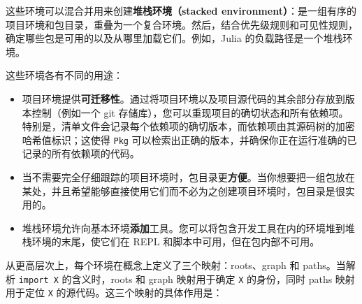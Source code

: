 这些环境可以混合并用来创建\textbf{堆栈环境（stacked environment）}：是一组有序的项目环境和包目录，重叠为一个复合环境。然后，结合优先级规则和可见性规则，确定哪些包是可用的以及从哪里加载它们。例如，Julia 的负载路径是一个堆栈环境。



这些环境各有不同的用途：



\begin{itemize}
\item 项目环境提供\textbf{可迁移性}。通过将项目环境以及项目源代码的其余部分存放到版本控制（例如一个 git 存储库），您可以重现项目的确切状态和所有依赖项。特别是，清单文件会记录每个依赖项的确切版本，而依赖项由其源码树的加密哈希值标识；这使得 \texttt{Pkg} 可以检索出正确的版本，并确保你正在运行准确的已记录的所有依赖项的代码。


\item 当不需要完全仔细跟踪的项目环境时，包目录更\textbf{方便}。当你想要把一组包放在某处，并且希望能够直接使用它们而不必为之创建项目环境时，包目录是很实用的。


\item 堆栈环境允许向基本环境\textbf{添加}工具。您可以将包含开发工具在内的环境堆到堆栈环境的末尾，使它们在 REPL 和脚本中可用，但在包内部不可用。

\end{itemize}


从更高层次上，每个环境在概念上定义了三个映射：roots、graph 和 paths。当解析 \texttt{import X} 的含义时，roots 和 graph 映射用于确定 \texttt{X} 的身份，同时 paths 映射用于定位 \texttt{X} 的源代码。这三个映射的具体作用是：



